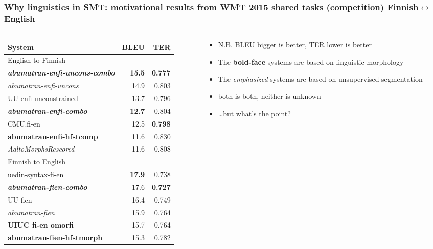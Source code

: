 \documentclass{beamer}
\begin{document}
\begin{frame}
    \frametitle{Why linguistics in SMT: motivational results from
    WMT 2015 shared tasks (competition) Finnish$\leftrightarrow$English}
    \begin{columns}
        \begin{column}{.40\textwidth}
    \tiny{
                   \begin{tabular}{|l|r|r|}
                        \hline
    \bf System & \bf BLEU & \bf TER \\
    \hline
    English to Finnish \\
    \bf \em abumatran-enfi-uncons-combo & \bf 15.5 & \bf 0.777 \\
    \em abumatran-enfi-uncons  & 14.9 & 0.803 \\
    UU-enfi-unconstrained  & 13.7 & 0.796 \\
    \hline
    \bf \em abumatran-enfi-combo  & \bf 12.7 & 0.804 \\
    CMU.fi-en  & 12.5 & \bf 0.798 \\
    \bf abumatran-enfi-hfstcomp & 11.6 & 0.830 \\
    \em AaltoMorphsRescored & 11.6 & 0.808 \\
    \hline
Finnish to English \\
    \hline
    uedin-syntax-fi-en & \bf 17.9 & 0.738 \\
    \bf \em abumatran-fien-combo  & 17.6 & \bf 0.727 \\
    UU-fien & 16.4 & 0.749 \\
    \em abumatran-fien & 15.9 & 0.764 \\
    \bf UIUC fi-en omorfi & 15.7 & 0.764 \\
    \bf abumatran-fien-hfstmorph & 15.3 & 0.782 \\
    \hline
\end{tabular}
    }
    \end{column}
    \begin{column}{.59\textwidth}
        \begin{itemize}
            \item N.B. BLEU bigger is better, TER lower is better
        \item The \textbf{bold-face} systems are based on linguistic
            morphology
        \item The \emph{emphasized} systems are based on unsupervised
            segmentation
        \item both is both, neither is unknown
        \item \ldots but what's the point? 
        \end{itemize}
    \end{column}
\end{columns}
\end{frame}
\end{document}
